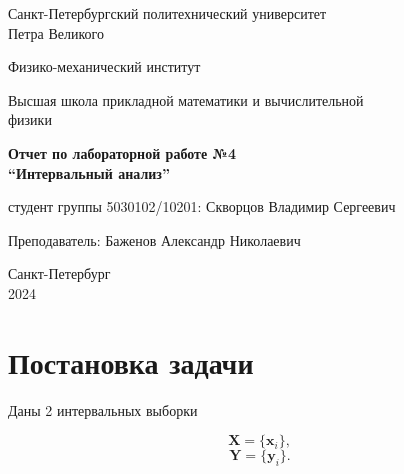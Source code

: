 \documentclass{article}
\begin{document}
  \begin{titlepage}
    \begin{center}
      Санкт-Петербургский политехнический университет \\Петра Великого
    \end{center}

    \begin{center}
      Физико-механический институт
    \end{center}

    \begin{center}
      Высшая школа прикладной математики и вычислительной\\ физики
    \end{center}

    \vspace{8em}

    \begin{center}
      \textbf{Отчет по лабораторной работе №4}\\
      \textbf{“Интервальный анализ”}
    \end{center}

    \vspace{\fill}

    \begin{flushright}
       студент группы 5030102/10201:
      \hfill
      Скворцов Владимир Сергеевич \\
    \end{flushright}
    Преподаватель: \hfill Баженов Александр Николаевич

    \vspace{12em}

    \begin{center}
      Санкт-Петербург\\
      2024
    \end{center}
  \end{titlepage}

  \tableofcontents

  \newpage

  \section{Постановка задачи}

  Даны 2 интервальных выборки

  \begin{equation}
    \mathbf{X} = \{ \mathbf{x}_i \},
  \end{equation}
  \begin{equation}
    \mathbf{Y} = \{ \mathbf{y}_i \}.
  \end{equation}
\end{document}
